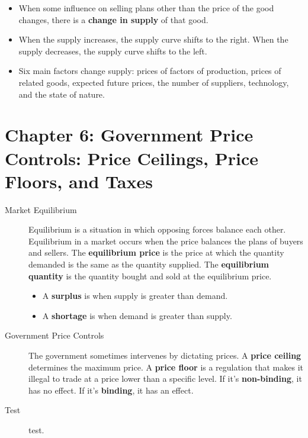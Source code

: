 \documentclass{article}
\begin{document}
\begin{description}
    \begin{itemize}
        \item When some influence on selling plans other than the price of the good changes, there is a \textbf{change in supply} of that good.
        \item When the supply increases, the supply curve shifts to the right. When the supply decreases, the supply curve shifts to the left.
        \item Six main factors change supply: prices of factors of production, prices of related goods, expected future prices, the number of suppliers, technology, and the state of nature.
    \end{itemize}
\end{description}
\section*{Chapter 6: Government Price Controls: Price Ceilings, Price Floors, and Taxes}
\begin{description}
    \item [Market Equilibrium] Equilibrium is a situation in which opposing forces balance each other. Equilibrium in a market occurs when the price balances the plans of buyers and sellers. The \textbf{equilibrium price} is the price at which the quantity demanded is the same as the quantity supplied. The \textbf{equilibrium quantity} is the quantity bought and sold at the equilibrium price.
    \begin{itemize}
        \item A \textbf{surplus} is when supply is greater than demand.
        \item A \textbf{shortage} is when demand is greater than supply.
    \end{itemize}
    \item [Government Price Controls] The government sometimes intervenes by dictating prices. A \textbf{price ceiling} determines the maximum price. A \textbf{price floor} is a regulation that makes it illegal to trade at a price lower than a specific level. If it's \textbf{non-binding}, it has no effect. If it's \textbf{binding}, it has an effect.
    \item [Test] test.
\end{description}
\end{document}
